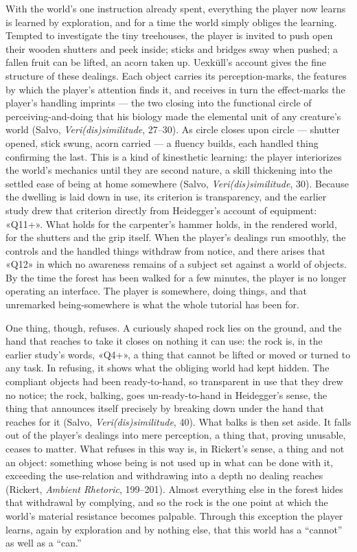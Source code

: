 With the world's one instruction already spent, everything the player now learns is learned by exploration, and for a time the world simply obliges the learning. Tempted to investigate the tiny treehouses, the player is invited to push open their wooden shutters and peek inside; sticks and bridges sway when pushed; a fallen fruit can be lifted, an acorn taken up. Uexküll's account gives the fine structure of these dealings. Each object carries its perception-marks, the features by which the player's attention finds it, and receives in turn the effect-marks the player's handling imprints — the two closing into the functional circle of perceiving-and-doing that his biology made the elemental unit of any creature's world (Salvo, \textit{Veri(dis)similitude}, 27--30). As circle closes upon circle — shutter opened, stick swung, acorn carried — a fluency builds, each handled thing confirming the last. This is a kind of kinesthetic learning: the player interiorizes the world's mechanics until they are second nature, a skill thickening into the settled ease of being at home somewhere (Salvo, \textit{Veri(dis)similitude}, 30). Because the dwelling is laid down in use, its criterion is transparency, and the earlier study drew that criterion directly from Heidegger's account of equipment: «Q11+». What holds for the carpenter's hammer holds, in the rendered world, for the shutters and the grip itself. When the player's dealings run smoothly, the controls and the handled things withdraw from notice, and there arises that «Q12» in which no awareness remains of a subject set against a world of objects. By the time the forest has been walked for a few minutes, the player is no longer operating an interface. The player is somewhere, doing things, and that unremarked being-somewhere is what the whole tutorial has been for.

One thing, though, refuses. A curiously shaped rock lies on the ground, and the hand that reaches to take it closes on nothing it can use: the rock is, in the earlier study's words, «Q4+», a thing that cannot be lifted or moved or turned to any task. In refusing, it shows what the obliging world had kept hidden. The compliant objects had been ready-to-hand, so transparent in use that they drew no notice; the rock, balking, goes un-ready-to-hand in Heidegger's sense, the thing that announces itself precisely by breaking down under the hand that reaches for it (Salvo, \textit{Veri(dis)similitude}, 40). What balks is then set aside. It falls out of the player's dealings into mere perception, a thing that, proving unusable, ceases to matter. What refuses in this way is, in Rickert's sense, a thing and not an object: something whose being is not used up in what can be done with it, exceeding the use-relation and withdrawing into a depth no dealing reaches (Rickert, \textit{Ambient Rhetoric}, 199--201). Almost everything else in the forest hides that withdrawal by complying, and so the rock is the one point at which the world's material resistance becomes palpable. Through this exception the player learns, again by exploration and by nothing else, that this world has a ``cannot'' as well as a ``can.''

